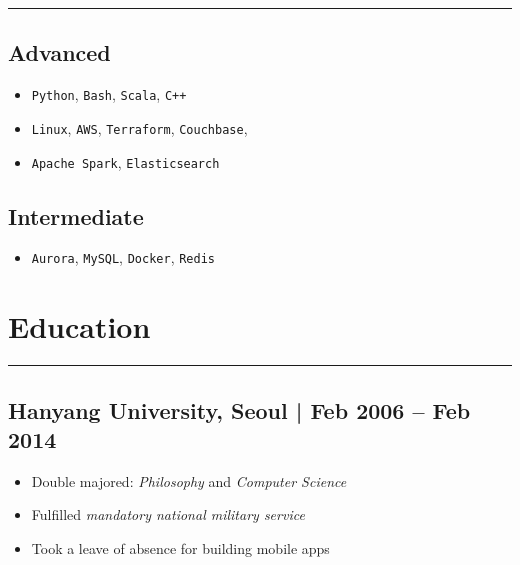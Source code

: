\documentclass[11pt]{article}
\begin{document}
\noindent\rule{\textwidth}{0.5pt}
\vspace{-4ex}

\subsection*{Advanced}
\label{sec:orgef51ce6}
\begin{itemize}
\item \texttt{Python}, \texttt{Bash}, \texttt{Scala}, \texttt{C++}
\item \texttt{Linux}, \texttt{AWS}, \texttt{Terraform}, \texttt{Couchbase},
\item \texttt{Apache Spark}, \texttt{Elasticsearch}
\end{itemize}

\subsection*{Intermediate}
\label{sec:orgbfba2f5}
\begin{itemize}
\item \texttt{Aurora}, \texttt{MySQL}, \texttt{Docker}, \texttt{Redis}
\end{itemize}

\section*{Education}
\label{sec:org62053f9}
\vspace{-4ex}

\noindent\rule{\textwidth}{0.5pt}
\vspace{-4ex}

\subsection*{Hanyang University, Seoul | Feb 2006 – Feb 2014}
\label{sec:org44def7c}
\begin{itemize}[label=$\circ$,itemsep=-0.5ex]
\item Double majored: \emph{Philosophy} and \emph{Computer Science}
\item Fulfilled \emph{mandatory national military service}
\item Took a leave of absence for building mobile apps
\end{itemize}
\end{document}
